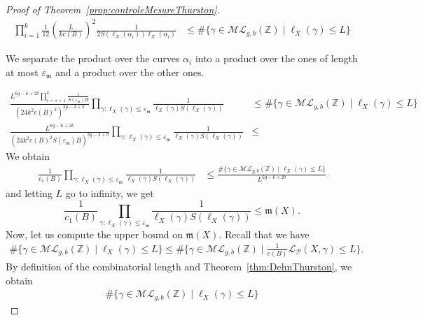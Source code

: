 \documentclass[a4paper,12pt]{article}
\theoremstyle{definition}
\theoremstyle{remark}
\begin{document}
\begin{proof}[Proof of Theorem~\ref{prop:controleMesureThurston}]
    \begin{align*}
         \prod_{i=1}^{k} \frac{1}{12} \left( \frac{L}{kc(B)} \right)^2 \frac{1}{2S(\ell_X(\alpha_i))\ell_X(\alpha_i)} & 
        \leqslant \# \{ \gamma \in \mathcal{ML}_{g,b}(\mathbb{Z}) \mid \ell_X(\gamma) \leqslant L \} 
    \end{align*}  
        
    We separate the product over the curves $\alpha_i$ into a product over the ones of length at most $\varepsilon_{\mathfrak{m}}$ and a product over the other ones. 
      
    \begin{align*}
         \frac{L^{6g-6+2b}\prod_{i=s+1}^k\frac{1}{S(\varepsilon_{\mathfrak{m}})B}}{(24k^2c(B)^2 )^{3g-3+b}} \prod_{\gamma : \ell_X(\gamma)\leqslant \varepsilon_{\mathfrak{m}}}\frac{1}{\ell_X(\gamma)S(\ell_X(\gamma))} &
        \leqslant \# \{ \gamma \in \mathcal{ML}_{g,b}(\mathbb{Z}) \mid \ell_X(\gamma) \leqslant L \}  \\
         \frac{L^{6g-6+2b}}{(24k^2c(B)^2S(\varepsilon_{\mathfrak{m}})B)^{3g-3+b}} \prod_{\gamma : \ell_X(\gamma)\leqslant \varepsilon_{\mathfrak{m}}}\frac{1}{\ell_X(\gamma)S(\ell_X(\gamma))}  &
        \leqslant 
    \end{align*}  
    We obtain
    \begin{align*}  
         \frac{1}{c_1(B)} \prod_{\gamma : \ell_X(\gamma)\leqslant \varepsilon_{\mathfrak{m}}}\frac{1}{\ell_X(\gamma)S(\ell_X(\gamma))}  &
        \leqslant \frac{\# \{ \gamma \in \mathcal{ML}_{g,b}(\mathbb{Z}) \mid \ell_X(\gamma) \leqslant L \} }{L^{6g-6+2b}}
    \end{align*}
    and letting $L$ go to infinity, we get 
    \[
         \frac{1}{c_1(B)} \prod_{\gamma : \ell_X(\gamma)\leqslant \varepsilon_{\mathfrak{m}}}\frac{1}{\ell_X(\gamma)S(\ell_X(\gamma))}  
        \leqslant \mathfrak{m}(X).
    \]
    Now, let us compute the upper bound on $\mathfrak{m}(X)$. Recall that we have
    \begin{align*}
        \# \{ \gamma \in \mathcal{ML}_{g,b}(\mathbb{Z}) \mid \ell_X(\gamma) \leqslant L \} 
        \leqslant \# \{  \gamma \in \mathcal{ML}_{g,b}(\mathbb{Z}) \mid \frac{1}{c(B)}\mathcal{L}_{\mathcal{P}}(X,\gamma) \leqslant L  \}.
    \end{align*}
    By definition of the combinatorial length and Theorem~\ref{thm:DehnThurston}, we obtain
    {\small
    \begin{align*}
        \# \{ \gamma \in \mathcal{ML}_{g,b}(\mathbb{Z}) \mid \ell_X(\gamma) \leqslant L \} 

\end{align*}}
\end{proof}
\end{document}
